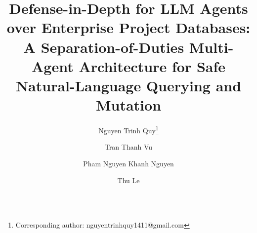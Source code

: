 \documentclass[runningheads]{llncs}
\begin{document}
%
\title{Defense-in-Depth for LLM Agents over Enterprise Project Databases: A Separation-of-Duties Multi-Agent Architecture for Safe Natural-Language Querying and Mutation}
%
%
\author{Nguyen Trinh Quy\thanks{Corresponding author: nguyentrinhquy1411@gmail.com} \and
Tran Thanh Vu \and
Pham Nguyen Khanh Nguyen \and
Thu Le}
%
%
%
\maketitle
%
\end{document}
